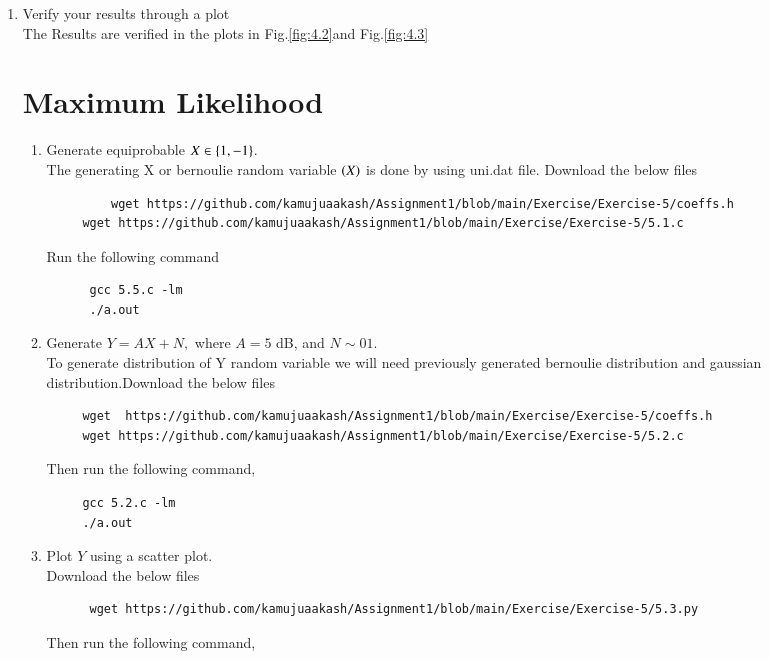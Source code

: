 \documentclass[journal,12pt,twocolumn]{IEEEtran}
\renewcommand\thesection{\arabic{section}}
\begin{document}
\begin{enumerate}[label=\thesection.\arabic*
,ref=\thesection.\theenumi]
\begin{enumerate}
    \end{enumerate}
\item Verify your results through a plot \\
\solution The Results are verified in the plots in Fig.\ref{fig:4.2}and Fig.\ref{fig:4.3}\section{Maximum Likelihood}
\begin{enumerate}[label=\thesection.\arabic*
,ref=\thesection.\theenumi]
\item Generate equiprobable $X \in \left\{1,-1\right\}$.\\	
  \solution The generating X or bernoulie random variable $ \left(X\right)$ is done by using uni.dat file. Download the below files
    \begin{lstlisting}
         wget https://github.com/kamujuaakash/Assignment1/blob/main/Exercise/Exercise-5/coeffs.h
	 wget https://github.com/kamujuaakash/Assignment1/blob/main/Exercise/Exercise-5/5.1.c
    \end{lstlisting}
  Run the following command
    \begin{lstlisting}
	  gcc 5.5.c -lm
	  ./a.out 
    \end{lstlisting} 
\item Generate
$
Y = AX+N,
$
	where $A = 5$ dB,  and $N \sim {0}{1}$.\\
  \solution To generate distribution of Y random variable we will need previously generated bernoulie distribution and gaussian distribution.Download the below files
    \begin{lstlisting}
     wget  https://github.com/kamujuaakash/Assignment1/blob/main/Exercise/Exercise-5/coeffs.h
     wget https://github.com/kamujuaakash/Assignment1/blob/main/Exercise/Exercise-5/5.2.c
    \end{lstlisting}
   Then run the following command,
    \begin{lstlisting}
     gcc 5.2.c -lm
     ./a.out
    \end{lstlisting}
\item Plot $Y$ using a scatter plot.\\
 \solution Download the below files
    \begin{lstlisting}
      wget https://github.com/kamujuaakash/Assignment1/blob/main/Exercise/Exercise-5/5.3.py
    \end{lstlisting}
   Then run the following command,
    \begin{lstlisting}

\end{lstlisting}
\end{enumerate}
\end{enumerate}
\end{document}
